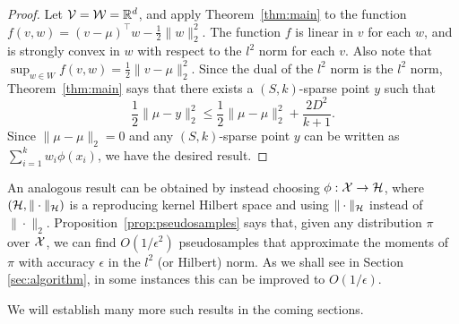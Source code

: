 \documentclass[paper.tex]{subfiles}
\begin{document}
\begin{proof}
Let $\mathcal{V} = \mathcal{W} = \mathbb R^d$, and apply Theorem~\ref{thm:main} to the function 
$f(v,w) = (v-\mu)^{\top}w - \frac{1}{2}\|w\|_2^2$. The function $f$ is 
linear in $v$ for each $w$, and is strongly convex in $w$ with respect to the 
$l^2$ norm for each $v$. Also note that 
$\sup_{w \in W} f(v,w) = \frac{1}{2}\|v-\mu\|_2^2$. Since the dual of the 
$l^2$ norm is the $l^2$ norm, Theorem~\ref{thm:main} says that there exists 
a $(S,k)$-sparse point $y$ such that
\[ \frac{1}{2}\|\mu - y\|_2^2 \leq \frac{1}{2}\|\mu - \mu\|_2^2 + \frac{2D^2}{k+1}. \]
Since $\|\mu-\mu\|_2 = 0$ and any $(S,k)$-sparse point $y$ can be written 
as $\sum_{i=1}^k w_i \phi(x_i)$, we have the desired result.
\end{proof}
An analogous result can be obtained by instead choosing $\phi : \mathcal X \to \mathcal H$, where $(\mathcal H, \|\cdot\|_{\mathcal H})$ is a reproducing kernel Hilbert space and using $\|\cdot\|_{\mathcal H}$ instead of $\|\cdot\|_{2}$. 
Proposition~\ref{prop:pseudosamples} says that, given any distribution 
$\pi$ over $\mathcal{X}$, we can find $O(1/\epsilon^2)$ pseudosamples that approximate 
the moments of $\pi$ with accuracy $\epsilon$ in the $l^2$ (or Hilbert) norm. As
we shall see in Section \ref{sec:algorithm}, in some instances this 
can be improved to $O(1/\epsilon)$.

We will establish many more such results in the coming sections.

\end{document}
